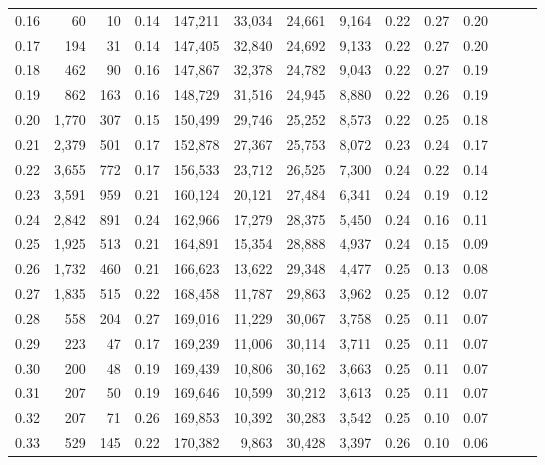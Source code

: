\begin{tabular}{rrrrrrrrrrrrrr}
0.16 &      60 &     10 &  0.14 &  147,211 &   33,034 &  24,661 &   9,164 &  0.22 &  0.27 &      0.20 \\
0.17 &     194 &     31 &  0.14 &  147,405 &   32,840 &  24,692 &   9,133 &  0.22 &  0.27 &      0.20 \\
0.18 &     462 &     90 &  0.16 &  147,867 &   32,378 &  24,782 &   9,043 &  0.22 &  0.27 &      0.19 \\
0.19 &     862 &    163 &  0.16 &  148,729 &   31,516 &  24,945 &   8,880 &  0.22 &  0.26 &      0.19 \\
0.20 &   1,770 &    307 &  0.15 &  150,499 &   29,746 &  25,252 &   8,573 &  0.22 &  0.25 &      0.18 \\
0.21 &   2,379 &    501 &  0.17 &  152,878 &   27,367 &  25,753 &   8,072 &  0.23 &  0.24 &      0.17 \\
0.22 &   3,655 &    772 &  0.17 &  156,533 &   23,712 &  26,525 &   7,300 &  0.24 &  0.22 &      0.14 \\
0.23 &   3,591 &    959 &  0.21 &  160,124 &   20,121 &  27,484 &   6,341 &  0.24 &  0.19 &      0.12 \\
0.24 &   2,842 &    891 &  0.24 &  162,966 &   17,279 &  28,375 &   5,450 &  0.24 &  0.16 &      0.11 \\
0.25 &   1,925 &    513 &  0.21 &  164,891 &   15,354 &  28,888 &   4,937 &  0.24 &  0.15 &      0.09 \\
0.26 &   1,732 &    460 &  0.21 &  166,623 &   13,622 &  29,348 &   4,477 &  0.25 &  0.13 &      0.08 \\
0.27 &   1,835 &    515 &  0.22 &  168,458 &   11,787 &  29,863 &   3,962 &  0.25 &  0.12 &      0.07 \\
0.28 &     558 &    204 &  0.27 &  169,016 &   11,229 &  30,067 &   3,758 &  0.25 &  0.11 &      0.07 \\
0.29 &     223 &     47 &  0.17 &  169,239 &   11,006 &  30,114 &   3,711 &  0.25 &  0.11 &      0.07 \\
0.30 &     200 &     48 &  0.19 &  169,439 &   10,806 &  30,162 &   3,663 &  0.25 &  0.11 &      0.07 \\
0.31 &     207 &     50 &  0.19 &  169,646 &   10,599 &  30,212 &   3,613 &  0.25 &  0.11 &      0.07 \\
0.32 &     207 &     71 &  0.26 &  169,853 &   10,392 &  30,283 &   3,542 &  0.25 &  0.10 &      0.07 \\
0.33 &     529 &    145 &  0.22 &  170,382 &    9,863 &  30,428 &   3,397 &  0.26 &  0.10 &      0.06 \\

\end{tabular}
